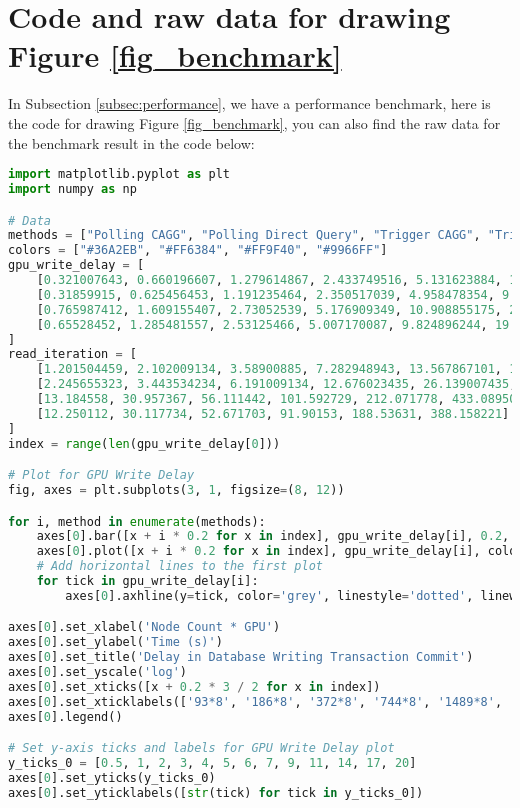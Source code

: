 \chapter{Code and raw data for drawing Figure \ref{fig_benchmark}}
In Subsection \ref{subsec:performance}, we have a performance benchmark, here is the code for drawing Figure \ref{fig_benchmark}, you can also find the raw data for the benchmark result in the code below:

\begin{lstlisting}[language=Python]
import matplotlib.pyplot as plt
import numpy as np

# Data
methods = ["Polling CAGG", "Polling Direct Query", "Trigger CAGG", "Trigger in Memory"]
colors = ["#36A2EB", "#FF6384", "#FF9F40", "#9966FF"]
gpu_write_delay = [
    [0.321007643, 0.660196607, 1.279614867, 2.433749516, 5.131623884, 11.624568741],
    [0.31859915, 0.625456453, 1.191235464, 2.350517039, 4.958478354, 9.977873813],
    [0.765987412, 1.609155407, 2.73052539, 5.176909349, 10.908855175, 20.96940738],
    [0.65528452, 1.285481557, 2.53125466, 5.007170087, 9.824896244, 19.604722893]
]
read_iteration = [
    [1.201504459, 2.102009134, 3.58900885, 7.282948943, 13.567867101, 18.581255946],
    [2.245655323, 3.443534234, 6.191009134, 12.676023435, 26.139007435, 55.204802484],
    [13.184558, 30.957367, 56.111442, 101.592729, 212.071778, 433.089509],
    [12.250112, 30.117734, 52.671703, 91.90153, 188.53631, 388.158221]
]
index = range(len(gpu_write_delay[0]))

# Plot for GPU Write Delay
fig, axes = plt.subplots(3, 1, figsize=(8, 12))

for i, method in enumerate(methods):
    axes[0].bar([x + i * 0.2 for x in index], gpu_write_delay[i], 0.2, label=method, color=colors[i])
    axes[0].plot([x + i * 0.2 for x in index], gpu_write_delay[i], color=colors[i], marker='o', linewidth=1, markersize=2)
    # Add horizontal lines to the first plot
    for tick in gpu_write_delay[i]:
        axes[0].axhline(y=tick, color='grey', linestyle='dotted', linewidth=0.3)

axes[0].set_xlabel('Node Count * GPU')
axes[0].set_ylabel('Time (s)')
axes[0].set_title('Delay in Database Writing Transaction Commit')
axes[0].set_yscale('log')
axes[0].set_xticks([x + 0.2 * 3 / 2 for x in index])
axes[0].set_xticklabels(['93*8', '186*8', '372*8', '744*8', '1489*8', '2978*8'])
axes[0].legend()

# Set y-axis ticks and labels for GPU Write Delay plot
y_ticks_0 = [0.5, 1, 2, 3, 4, 5, 6, 7, 9, 11, 14, 17, 20]
axes[0].set_yticks(y_ticks_0)
axes[0].set_yticklabels([str(tick) for tick in y_ticks_0])



\end{lstlisting}
